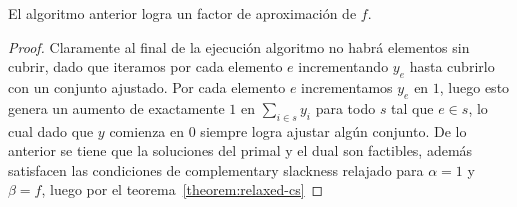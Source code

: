 \documentclass[../np-approximations.tex]{subfiles}
\begin{document}
\begin{theorem}
	El algoritmo anterior logra un factor de aproximación de $f$.
\end{theorem}

\begin{proof}
	Claramente al final de la ejecución algoritmo no habrá elementos sin cubrir, dado que iteramos por cada elemento $e$ incrementando $y_e$ hasta cubrirlo con un conjunto ajustado. Por cada elemento $e$ incrementamos $y_e$ en $1$, luego esto genera un aumento de exactamente $1$ en $\sum_{i \in s} y_i$ para todo $s$ tal que $e \in s$, lo cual dado que $y$ comienza en $0$ siempre logra ajustar algún conjunto.
	De lo anterior se tiene que la soluciones del primal y el dual son factibles, además satisfacen las condiciones de complementary slackness relajado para $\alpha=1$ y $\beta=f$, luego por el teorema~\ref{theorem:relaxed-cs}
	
\end{proof}
\end{document}
